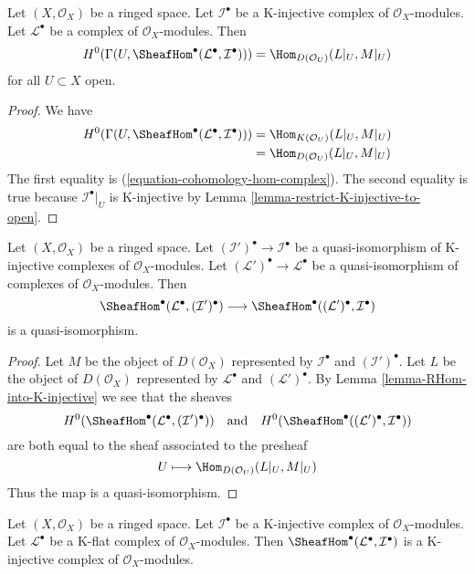 \begin{lemma}
\label{lemma-RHom-into-K-injective}
Let $(X, \mathcal{O}_X)$ be a ringed space. Let $\mathcal{I}^\bullet$
be a K-injective complex of $\mathcal{O}_X$-modules. Let
$\mathcal{L}^\bullet$ be a complex of $\mathcal{O}_X$-modules.
Then
$$
H^0(\Gamma(U, \SheafHom^\bullet(\mathcal{L}^\bullet, \mathcal{I}^\bullet))) =
\Hom_{D(\mathcal{O}_U)}(L|_U, M|_U)
$$
for all $U \subset X$ open.
\end{lemma}

\begin{proof}
We have
\begin{align*}
H^0(\Gamma(U, \SheafHom^\bullet(\mathcal{L}^\bullet, \mathcal{I}^\bullet)))
& =
\Hom_{K(\mathcal{O}_U)}(L|_U, M|_U) \\
& =
\Hom_{D(\mathcal{O}_U)}(L|_U, M|_U)
\end{align*}
The first equality is (\ref{equation-cohomology-hom-complex}).
The second equality is true because $\mathcal{I}^\bullet|_U$
is K-injective by Lemma \ref{lemma-restrict-K-injective-to-open}.
\end{proof}

\begin{lemma}
\label{lemma-RHom-well-defined}
Let $(X, \mathcal{O}_X)$ be a ringed space. Let
$(\mathcal{I}')^\bullet \to \mathcal{I}^\bullet$
be a quasi-isomorphism of K-injective complexes of $\mathcal{O}_X$-modules.
Let $(\mathcal{L}')^\bullet \to \mathcal{L}^\bullet$
be a quasi-isomorphism of complexes of $\mathcal{O}_X$-modules.
Then
$$
\SheafHom^\bullet(\mathcal{L}^\bullet, (\mathcal{I}')^\bullet)
\longrightarrow
\SheafHom^\bullet((\mathcal{L}')^\bullet, \mathcal{I}^\bullet)
$$
is a quasi-isomorphism.
\end{lemma}

\begin{proof}
Let $M$ be the object of $D(\mathcal{O}_X)$ represented by
$\mathcal{I}^\bullet$ and $(\mathcal{I}')^\bullet$.
Let $L$ be the object of $D(\mathcal{O}_X)$ represented by
$\mathcal{L}^\bullet$ and $(\mathcal{L}')^\bullet$.
By Lemma \ref{lemma-RHom-into-K-injective}
we see that the sheaves
$$
H^0(\SheafHom^\bullet(\mathcal{L}^\bullet, (\mathcal{I}')^\bullet))
\quad\text{and}\quad
H^0(\SheafHom^\bullet((\mathcal{L}')^\bullet, \mathcal{I}^\bullet))
$$
are both equal to the sheaf associated to the presheaf
$$
U \longmapsto \Hom_{D(\mathcal{O}_U)}(L|_U, M|_U)
$$
Thus the map is a quasi-isomorphism.
\end{proof}

\begin{lemma}
\label{lemma-RHom-from-K-flat-into-K-injective}
Let $(X, \mathcal{O}_X)$ be a ringed space. Let $\mathcal{I}^\bullet$
be a K-injective complex of $\mathcal{O}_X$-modules. Let
$\mathcal{L}^\bullet$ be a K-flat complex of $\mathcal{O}_X$-modules.
Then $\SheafHom^\bullet(\mathcal{L}^\bullet, \mathcal{I}^\bullet)$
is a K-injective complex of $\mathcal{O}_X$-modules.
\end{lemma}

